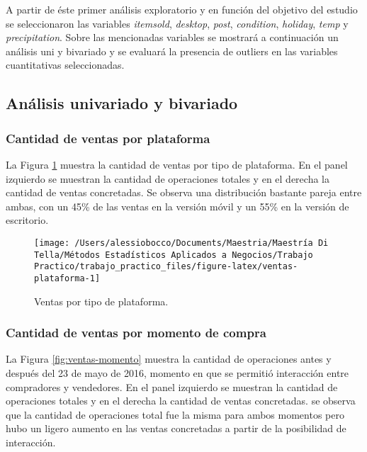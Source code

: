 \documentclass[
  12pt]{article}
\begin{document}
A partir de éste primer análisis exploratorio y en función del objetivo del estudio se seleccionaron las variables \emph{itemsold}, \emph{desktop}, \emph{post}, \emph{condition}, \emph{holiday}, \emph{temp} y \emph{precipitation}. Sobre las mencionadas variables se mostrará a continuación un análisis uni y bivariado y se evaluará la presencia de outliers en las variables cuantitativas seleccionadas.

\hypertarget{anuxe1lisis-univariado-y-bivariado}{%
\subsection{Análisis univariado y bivariado}\label{anuxe1lisis-univariado-y-bivariado}}

\hypertarget{cantidad-de-ventas-por-plataforma}{%
\subsubsection{Cantidad de ventas por plataforma}\label{cantidad-de-ventas-por-plataforma}}

La Figura \ref{fig:ventas-plataforma} muestra la cantidad de ventas por tipo de plataforma. En el panel izquierdo se muestran la cantidad de operaciones totales y en el derecha la cantidad de ventas concretadas. Se observa una distribución bastante pareja entre ambas, con un 45\% de las ventas en la versión móvil y un 55\% en la versión de escritorio.

\begin{figure}

{\centering \texttt{[image: /Users/alessiobocco/Documents/Maestria/Maestría Di Tella/Métodos Estadísticos Aplicados a Negocios/Trabajo Practico/trabajo\_practico\_files/figure-latex/ventas-plataforma-1]} 

}

\caption{Ventas por tipo de plataforma.}\label{fig:ventas-plataforma}
\end{figure}

\hypertarget{cantidad-de-ventas-por-momento-de-compra}{%
\subsubsection{Cantidad de ventas por momento de compra}\label{cantidad-de-ventas-por-momento-de-compra}}

La Figura \ref{fig:ventas-momento} muestra la cantidad de operaciones antes y después del 23 de mayo de 2016, momento en que se permitió interacción entre compradores y vendedores. En el panel izquierdo se muestran la cantidad de operaciones totales y en el derecha la cantidad de ventas concretadas. se observa que la cantidad de operaciones total fue la misma para ambos momentos pero hubo un ligero aumento en las ventas concretadas a partir de la posibilidad de interacción.
\end{document}
